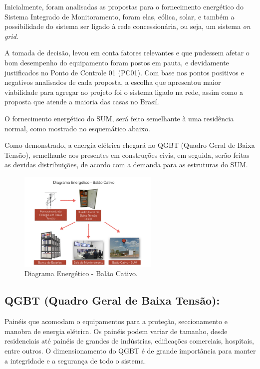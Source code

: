 Inicialmente, foram analisadas as propostas para o fornecimento energético do Sistema Integrado de Monitoramento, foram elas, eólica, solar, e também a possibilidade do sistema ser ligado à rede concessionária, ou seja, um sistema \textit{on grid}.

A tomada de decisão, levou em conta fatores relevantes e que pudessem afetar o bom desempenho do equipamento foram postos em pauta, e devidamente justificados no Ponto de Controle 01 (PC01). Com base nos pontos positivos e negativos analisados de cada proposta, a escolha que apresentou maior viabilidade para agregar ao projeto foi o sistema ligado na rede, assim como a proposta que atende a maioria das casas no Brasil.

O fornecimento energético do SUM, será feito semelhante à uma residência normal, como mostrado no esquemático abaixo.

Como demonstrado, a energia elétrica chegará no QGBT (Quadro Geral de Baixa Tensão), semelhante aos presentes em construções civis, em seguida, serão feitas as devidas distribuições, de acordo com a demanda para as estruturas do SUM.

\begin{figure}[H]
	\centering
	\includegraphics[width=0.6\textwidth]{figuras/Energetico}
	\caption{Diagrama Energético - Balão Cativo.}
	\label{img:Energetico}
\end{figure}

 \subsection{QGBT (Quadro Geral de Baixa Tensão):}
 Painéis que acomodam o equipamentos para a proteção, seccionamento e manobra de energia elétrica. Os painéis podem variar de tamanho, desde residenciais até painéis de grandes de indústrias, edificações comerciais, hospitais, entre outros. O dimensionamento do QGBT é de grande importância para manter a integridade e a segurança de todo o sistema.

